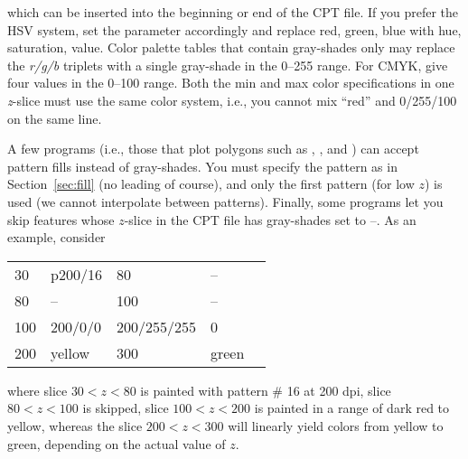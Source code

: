 \noindent
which can be inserted into the beginning or end of the CPT file.  If
you prefer the HSV system, set the
 parameter accordingly and replace red, green,
blue with hue, saturation, value.  Color palette tables that contain
gray-shades only may replace the \emph{r/g/b} triplets with a single gray-shade
in the 0--255 range.  For CMYK, give four values in the 0--100 range.
Both the min and max color specifications in one \emph{z}-slice must use
the same color system, i.e., you cannot mix ``red'' and 0/255/100 on the
same line.

A few programs (i.e., those that plot polygons such as ,
,  and ) can accept pattern fills instead
of gray-shades.  You must specify the pattern as in Section~\ref{sec:fill} (no
leading  of course), and only the first pattern (for low $z$) is used (we cannot
interpolate between patterns).
Finally, some programs let you skip features whose $z$-slice in the CPT file has
gray-shades set to --.  As an example, consider

\begin{center}
\begin{tabular}{lllll}
30 &  p200/16 &  80 & -- \\
80 &  -- &  100 &  -- \\
100 &  200/0/0  &  200/255/255  &  0 \\
200 &  yellow &  300 & green  \\
\end{tabular}
\end{center}
\noindent
where slice $30 < z < 80$ is painted with pattern \# 16 at 200 dpi,
slice $80 < z < 100$ is skipped, slice $100 < z < 200$ is
painted in a range of dark red to yellow, whereas the slice $200 < z < 300$
will linearly yield colors from yellow to green, depending on the actual value
of $z$.



